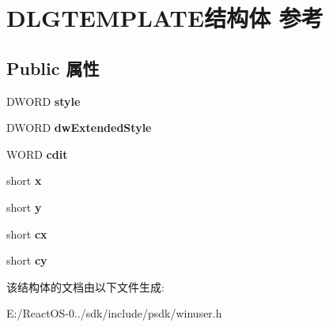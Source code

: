 \hypertarget{struct_d_l_g_t_e_m_p_l_a_t_e}{}\section{D\+L\+G\+T\+E\+M\+P\+L\+A\+T\+E结构体 参考}
\label{struct_d_l_g_t_e_m_p_l_a_t_e}
\subsection*{Public 属性}
\begin{DoxyCompactItemize}
\item 
\mbox{\label{struct_d_l_g_t_e_m_p_l_a_t_e_aa7a097423b6430559ffc51625589c792}} 
D\+W\+O\+RD {\bfseries style}
\item 
\mbox{\label{struct_d_l_g_t_e_m_p_l_a_t_e_ab44923f6973b13acad62d145e67553f8}} 
D\+W\+O\+RD {\bfseries dw\+Extended\+Style}
\item 
\mbox{\label{struct_d_l_g_t_e_m_p_l_a_t_e_a0ae01c445b730288839c2b814ec64403}} 
W\+O\+RD {\bfseries cdit}
\item 
\mbox{\label{struct_d_l_g_t_e_m_p_l_a_t_e_ab6f36b2ab03f269200604f8d9d5d9e2d}} 
short {\bfseries x}
\item 
\mbox{\label{struct_d_l_g_t_e_m_p_l_a_t_e_a6573994f392c92f0e482e1d78748a20d}} 
short {\bfseries y}
\item 
\mbox{\label{struct_d_l_g_t_e_m_p_l_a_t_e_adf8d404669a214da07e27ec010657cd9}} 
short {\bfseries cx}
\item 
\mbox{\label{struct_d_l_g_t_e_m_p_l_a_t_e_a7c8723c2bd38c07070b517011cc0bdf5}} 
short {\bfseries cy}
\end{DoxyCompactItemize}


该结构体的文档由以下文件生成\+:\begin{DoxyCompactItemize}
\item 
E\+:/\+React\+O\+S-\/0../sdk/include/psdk/winuser.\+h\end{DoxyCompactItemize}
